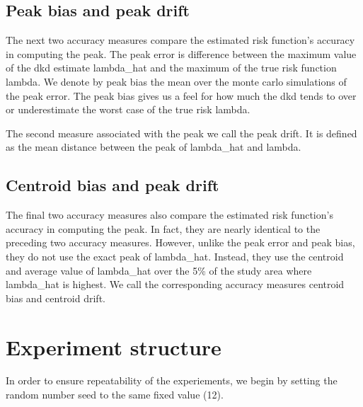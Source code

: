 \subsection{Peak bias and peak drift}
\label{subsec:method:peak_bias}

The next two accuracy measures compare the estimated risk function's accuracy in computing the peak.
The \gls{peak error} is difference between the maximum value of the \gls{dkd} estimate \gls{lambda_hat} and the maximum of the true risk function \gls{lambda}.
We denote by \gls{peak bias} the mean over the monte carlo simulations of the \gls{peak error}.
The \gls{peak bias} gives us a feel for how much the \gls{dkd} tends to over or underestimate the worst case of the true risk \gls{lambda}.

The second measure associated with the peak we call the \gls{peak drift}.
It is defined as the mean distance between the peak of \gls{lambda_hat} and \gls{lambda}.

\subsection{Centroid bias and peak drift}
\label{subsec:method:centroid_bias}

The final two accuracy measures also compare the estimated risk function's accuracy in computing the peak.
In fact, they are nearly identical to the preceding two accuracy measures.
However, unlike the \gls{peak error} and \gls{peak bias}, they do not use the exact peak of \gls{lambda_hat}.
Instead, they use the centroid and average value of \gls{lambda_hat} over the 5\% of the study area where \gls{lambda_hat} is highest.
We call the corresponding accuracy measures \gls{centroid bias} and \gls{centroid drift}.

\section{Experiment structure}
\label{sec:method:experiment_structure}

In order to ensure repeatability of the experiements, we begin by setting the random number seed to the same fixed value (12).


